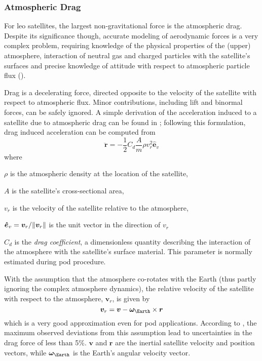 \subsubsection{Atmospheric Drag}\label{sssec:atmospheric-drag}

For \gls{leo} satellites, the largest non-gravitational force is the atmospheric 
drag. Despite its significance though, accurate modeling of aerodynamic forces 
is a very complex problem, requiring knowledge of the physical properties of the 
(upper) atmosphere, interaction of neutral gas and charged particles with the satellite's 
surfaces and precise knowledge of attitude with respect to atmospheric particle 
flux (\cite{Montenbruck2000}).

Drag is a decelerating force, directed opposite to the velocity of the satellite 
with respect to atmospheric flux. Minor contributions, including lift and binormal 
forces, can be safely ignored. A simple derivation of the acceleration induced 
to a satellite due to atmospheric drag can be found in \cite{Montenbruck2000}; 
following this formulation, drag induced acceleration can be computed from
\begin{equation}\label{eq:mont397}
  \bm{\ddot{r}} = -\frac{1}{2} C_{d} \frac{A}{m} \rho v_{r}^{2} \bm{\hat{e}}_v
\end{equation}
where
\begin{description}
  \item $\rho$ is the atmospheric density at the location of the satellite,
  \item $A$ is the satellite's cross-sectional area,
  \item $v_r$ is the velocity of the satellite relative to the atmosphere,
  \item $\bm{\hat{e}}_v = \bm{v}_r / \lVert\bm{v}_r\rVert$ is the unit vector in the 
    direction of $v_r$
  \item $C_d$ is the \emph{drag coefficient}, a dimensionless quantity describing the 
    interaction of the atmosphere with the satellite's surface material. This parameter 
    is normally estimated during \gls{pod} procedure.
\end{description}

With the assumption that the atmosphere co-rotates with the Earth (thus partly 
ignoring the complex atmosphere dynamics), the relative velocity of the satellite 
with respect to the atmosphere, $\bm{v}_r$, is given by
\begin{equation}\label{eq:mont398}
  \bm{v}_r = \bm{v} - \bm{\omega}_{\Earth} \times \bm{r}
\end{equation}
which is a very good approximation even for \gls{pod} applications. According 
to \cite{Montenbruck2000}, the maximum observed deviations from this assumption 
lead to uncertainties in the drag force of less than 5\%. $\bm{v}$ and $\bm{r}$ 
are the inertial satellite velocity and position vectors, while 
$\bm{\omega}_{\Earth}$ is the Earth's angular velocity vector.

